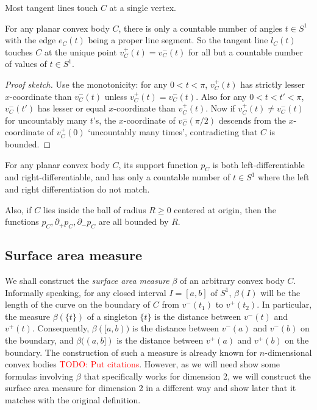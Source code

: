 Most tangent lines touch $C$ at a single vertex.
\begin{proposition}
For any planar convex body $C$, there is only a countable number of angles $t \in S^1$ with the edge $e_C(t)$ being a proper line segment.
So the tangent line $l_C(t)$ touches $C$ at the unique point $v^+_C(t) = v^-_C(t)$ for all but a countable number of values of $t \in S^1$.
\end{proposition}
\begin{proof}[Proof sketch]
Use the monotonicity: for any $0 < t < \pi$, $v_C^+(t)$ has strictly lesser $x$-coordinate than $v_C^-(t)$ unless $v_C^+(t) = v_C^-(t)$. Also for any $0 < t < t' < \pi$, $v_C^-(t')$ has lesser or equal $x$-coordinate than $v_C^+(t)$.
Now if $v_C^+(t) \neq v_C^-(t)$ for uncountably many $t$'s, the $x$-coordinate of $v_C^-(\pi / 2)$ descends from the $x$-coordinate of $v_C^+(0)$ `uncountably many times', contradicting that $C$ is bounded. 
\end{proof}

\begin{corollary}
\label{cor:func}
For any planar convex body $C$, its support function $p_C$ is both left-differentiable and right-differentiable, and has only a countable number of $t \in S^1$ where the left and right differentiation do not match.

Also, if $C$ lies inside the ball of radius $R \geq 0$ centered at origin, then the functions $p_C, \partial_+p_C, \partial_-p_C$ are all bounded by $R$.
\end{corollary}

\subsection{Surface area measure}

We shall construct the \emph{surface area measure} $\beta$ of an arbitrary convex body $C$. 
Informally speaking, for any closed interval $I = [a, b]$ of $S^1$, $\beta(I)$ will be the length of the curve on the boundary of $C$ from $v^-(t_1)$ to $v^+(t_2)$.
In particular, the measure $\beta(\{t\})$ of a singleton $\{t\}$ is the distance between $v^-(t)$ and $v^+(t)$.
Consequently, $\beta([a, b))$ is the distance between $v^-(a)$ and $v^-(b)$ on the boundary, and $\beta((a, b])$ is the distance between $v^+(a)$ and $v^+(b)$ on the boundary.
The construction of such a measure is already known for $n$-dimensional convex bodies \textcolor{red}{TODO: Put citations}. 
However, as we will need show some formulas involving $\beta$ that specifically works for dimension 2, we will construct the surface area measure for dimension 2 in a different way and show later that it matches with the original definition.

